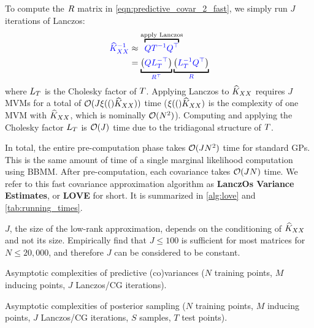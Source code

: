 To compute the $R$ matrix in \cref{eqn:predictive_covar_2_fast}, we simply run $J$ iterations of Lanczos:
\begin{align*}
  {\color{blue} \trainK^{-1}} &\approx \overbracket{\color{blue} \bQ \bT^{-1} \bQ^\top}^{\text{apply Lanczos}}
  \\
  &=
  \underbracket{ \left( {\color{blue} \bQ \bL_\bT^{-\top}} \right)}_{\color{blue} \bR^\top}
  \underbracket{ \left( {\color{blue} \bL_\bT^{-1} \bQ^\top} \right)}_{\color{blue} \bR}
\end{align*}
%
where $L_{T}$ is the Cholesky factor of $T$.
Applying Lanczos to $\widehat{K}_{XX}$ requires $J$ MVMs for a total of $\bigo{J \mvm(\trainK)}$ time ($\xi ( ( )\widehat{K}_{XX})$ is the complexity of one MVM with $\widehat{K}_{XX}$, which is nominally $\bigo{N^2}$).
Computing and applying the Cholesky factor $L_{T}$ is $\bigo{J}$ time due to the tridiagonal structure of $T$.

In total, the entire pre-computation phase takes $\bigo{J N^2}$ time for standard GPs.
This is the same amount of time of a single marginal likelihood computation using BBMM.
After pre-computation, each covariance takes $\bigo{JN}$ time.
We refer to this fast covariance approximation algorithm as {\bf LanczOs Variance Estimates}, or {\bf LOVE} for short.
It is summarized in \cref{alg:love} and \cref{tab:running_times}.

$J$, the size of the low-rank approximation, depends on the conditioning of $\widehat{K}_{XX}$ and not its size.
Empirically find that $J\leq100$ is sufficient for most matrices for $N \leq 20,\!000$, and therefore $J$ can be considered to be constant.



\begin{table*}[t!]
  \caption[Asymptotic complexities of predictive (co)variances with LOVE verses other methods.]{
    Asymptotic complexities of predictive (co)variances ($N$ training points, $M$ inducing points, $J$ Lanczos/CG iterations).
    \label{tab:running_times}
  }
  \vspace{0.5ex}
  \centering
  \resizebox{\textwidth}{!}{%
    
  }
  \vspace{-2ex}
\end{table*}

\begin{table*}[t!]
  \caption[Asymptotic complexities of posterior sampling with LOVE + KISS-GP verses other methods.]{
    Asymptotic complexities of posterior sampling
		($N$ training points, $M$ inducing points, $J$ Lanczos/CG iterations, $S$ samples, $T$ test points).
    \label{tab:running_times_sampling}
  }
  \vspace{0.5ex}
  \centering
  \resizebox{\textwidth}{!}{%
    
  }
  \vspace{-2ex}
\end{table*}



